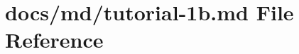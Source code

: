 \hypertarget{tutorial-1b_8md}{}\section{docs/md/tutorial-\/1b.md File Reference}
\label{tutorial-1b_8md}
